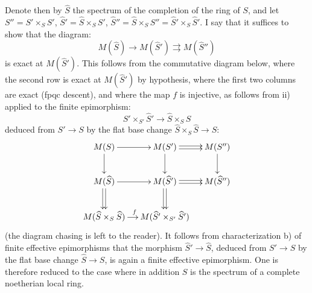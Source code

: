 Denote then by $\widehat S$ the spectrum of the completion of the ring of $S$, and let $S''=S'\times_S S'$, $\widehat S'=\widehat S\times_S S'$, $\widehat S''=\widehat S\times_S S''=\widehat S'\times_S\widehat S'$. I say that it suffices to show that the diagram:
\begin{equation}\tag{$\ast$}
M(\widehat S)\to M(\widehat S')\rightrightarrows M(\widehat S'')
\end{equation}
is exact at $M(\widehat S')$. This follows from the commutative diagram below, where the second row is exact at $M(\widehat S')$ by hypothesis, where the first two columns are exact (fpqc descent), and where the map $f$ is injective, as follows from ii) applied to the finite epimorphism:
\[
\widehat S'\times_{S'}\widehat S'\to\widehat S\times_S\widehat S
\]
deduced from $S'\to S$ by the flat base change $\widehat S\times_S\widehat S\to S$:
\[
\xymatrix@C=12pt{
M(S)\ar[r]\ar[d]&M(S')\ar@<.4ex>[r]\ar@<-.4ex>[r]\ar[d]&M(S'')\ar[d]\\
M(\widehat S)\ar[r]\ar@<.4ex>[d]\ar@<-.4ex>[d]&M(\widehat S')\ar@<.4ex>[r]\ar@<-.4ex>[r]\ar@<.4ex>[d]\ar@<-.4ex>[d]&M(\widehat S'')\\
M(\widehat S\times_S\widehat S)\ar[r]^f&M(\widehat S'\times_{S'}\widehat S')&
}
\]
(the diagram chasing is left to the reader). It follows from characterization b) of finite effective epimorphisms that the morphism $\widehat S'\to\widehat S$, deduced from $S'\to S$ by the flat base change $\widehat S\to S$, is again a finite effective epimorphism. One is therefore reduced to the case where in addition $S$ is the spectrum of a complete noetherian local ring.
